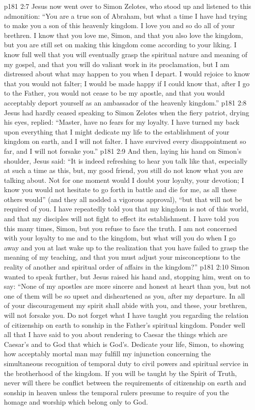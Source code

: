 \pc \vs p181 2:7 Jesus now went over to Simon Zelotes, who stood up and listened to this admonition: \textcolor{ubdarkred}{“You are a true son of Abraham, but what a time I have had trying to make you a son of this heavenly kingdom. I love you and so do all of your brethren. I know that you love me, Simon, and that you also love the kingdom, but you are still set on making this kingdom come according to your liking. I know full well that you will eventually grasp the spiritual nature and meaning of my gospel, and that you will do valiant work in its proclamation, but I am distressed about what may happen to you when I depart. I would rejoice to know that you would not falter; I would be made happy if I could know that, after I go to the Father, you would not cease to be my apostle, and that you would acceptably deport yourself as an ambassador of the heavenly kingdom.”}
\vs p181 2:8 Jesus had hardly ceased speaking to Simon Zelotes when the fiery patriot, drying his eyes, replied: “Master, have no fears for my loyalty. I have turned my back upon everything that I might dedicate my life to the establishment of your kingdom on earth, and I will not falter. I have survived every disappointment so far, and I will not forsake you.”
\vs p181 2:9 And then, laying his hand on Simon’s shoulder, Jesus said: \textcolor{ubdarkred}{“It is indeed refreshing to hear you talk like that, especially at such a time as this, but, my good friend, you still do not know what you are talking about. Not for one moment would I doubt your loyalty, your devotion; I know you would not hesitate to go forth in battle and die for me, as all these others would” (and they all nodded a vigorous approval), “but that will not be required of you. I have repeatedly told you that my kingdom is not of this world, and that my disciples will not fight to effect its establishment. I have told you this many times, Simon, but you refuse to face the truth. I am not concerned with your loyalty to me and to the kingdom, but what will you do when I go away and you at last wake up to the realization that you have failed to grasp the meaning of my teaching, and that you must adjust your misconceptions to the reality of another and spiritual order of affairs in the kingdom?”}
\vs p181 2:10 Simon wanted to speak further, but Jesus raised his hand and, stopping him, went on to say: \textcolor{ubdarkred}{“None of my apostles are more sincere and honest at heart than you, but not one of them will be so upset and disheartened as you, after my departure. In all of your discouragement my spirit shall abide with you, and these, your brethren, will not forsake you. Do not forget what I have taught you regarding the relation of citizenship on earth to sonship in the Father’s spiritual kingdom. Ponder well all that I have said to you about rendering to Caesar the things which are Caesar’s and to God that which is God’s. Dedicate your life, Simon, to showing how acceptably mortal man may fulfill my injunction concerning the simultaneous recognition of temporal duty to civil powers and spiritual service in the brotherhood of the kingdom. If you will be taught by the Spirit of Truth, never will there be conflict between the requirements of citizenship on earth and sonship in heaven unless the temporal rulers presume to require of you the homage and worship which belong only to God.}
